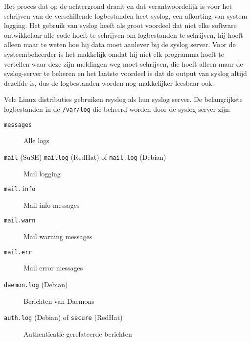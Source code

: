 Het proces dat op de achtergrond draait en dat verantwoordelijk is voor het schrijven van de verschillende logbestanden heet syslog, een afkorting van system logging. Het gebruik van syslog heeft als groot voordeel dat niet elke software ontwikkelaar alle code hoeft te schrijven om logbestanden te schrijven, hij hoeft alleen maar te weten hoe hij data moet aanlever bij de syslog server. Voor de systeembeheerder is het makkelijk omdat hij niet elk programma hoeft te vertellen waar deze zijn meldingen weg moet schrijven, die hoeft alleen maar de syslog-server te beheren en het laatste voordeel is dat de output van syslog altijd dezelfde is, dus de logbestanden worden nog makkelijker leesbaar ook.

Vele Linux distributies gebruiken rsyslog als hun syslog server. De belangrijkste logbestanden in de \texttt{/var/log} die beheerd worden door de syslog server zijn:
\begin{description}
\item[\texttt{messages}] Alle logs
\item[\texttt{mail} (SuSE) \texttt{maillog} (RedHat) of \texttt{mail.log} (Debian)] Mail logging
\item[\texttt{mail.info}] Mail info messages
\item[\texttt{mail.warn}] Mail warning messages
\item[\texttt{mail.err}] Mail error messages
\item[\texttt{daemon.log} (Debian)] Berichten van Daemons
\item[\texttt{auth.log} (Debian) of \texttt{secure} (RedHat)] Authenticatie gerelateerde berichten
\end{description}
